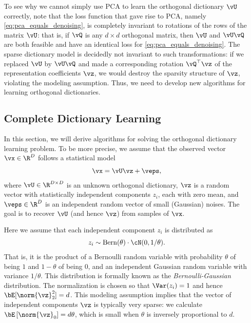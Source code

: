 \documentclass[../../book-main.tex]{subfiles}
\begin{document}
To see why we cannot simply use PCA to learn the orthogonal dictionary $\vU$ correctly, note that the 
loss function that gave rise to PCA, namely \eqref{eq:pca_equals_denoising}, is completely invariant to rotations of the rows of the matrix $\vU$: that is, if $\vQ$ is any $d \times d$ orthogonal matrix, then $\vU$ and $\vU \vQ$ are both feasible and have an identical loss for \eqref{eq:pca_equals_denoising}. The sparse dictionary model is decidedly not invariant to such transformations: if we replaced $\vU$ by $\vU \vQ$ and made a corresponding rotation $\vQ^\top \vz$ of the representation coefficients $\vz$, we would destroy the sparsity structure of $\vz$, violating the modeling assumption. Thus, we need to develop new algorithms for learning orthogonal dictionaries. 

\subsection{Complete Dictionary Learning}
\label{sec:complete-dictionary}

In this section, we will derive algorithms for solving the orthogonal dictionary learning problem. To be more precise,  we assume that the observed vector $\vx \in \R^D$ follows a statistical model
\begin{equation}
    \vx = \vU \vz + \veps, 
    \label{eq:ica-model-ch2}
\end{equation}
where $\vU \in \R^{D \times D}$ is an unknown orthogonal dictionary, $\vz$ is a random vector with statistically independent components $z_i$, each with zero mean, and $\veps \in \R^D$ is an independent random vector of small (Gaussian) noises. The goal is to recover $\vU$ (and hence $\vz$) from samples of $\vx$.

Here we assume that each independent component $z_i$ is distributed as $$z_i \sim \mathrm{Bern}(\theta) \cdot \cN(0, 1/\theta).$$ That is, it is the product of a Bernoulli random variable with probability $\theta$ of being $1$ and $1-\theta$ of being $0$, and an independent Gaussian random variable with variance $1/\theta$. This distribution is formally known as the {\em Bernoulli-Gaussian} distribution. 
The normalization is chosen so that $\Var(z_i) = 1$ and hence $\bE[\norm{\vz}_2^2]=d$. 
This modeling assumption implies that the vector of independent components $\vz$ is typically very sparse: 
we calculate $\bE\left[\norm{\vz}_0\right] = d\theta$, which is small when $\theta$ is inversely proportional to $d$. 
\end{document}
